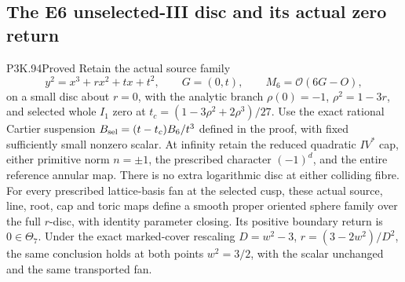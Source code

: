 \subsection{The E6 unselected-III disc and its actual zero return}
\begin{statement}{P3K.94}{Proved}
Retain the actual source family
\[
 y^2=x^3+r x^2+t x+t^2,\qquad G=(0,t),\qquad M_6=\mathcal O(6G-O),
\]
on a small disc about \(r=0\), with the analytic branch \(\rho(0)=-1\), \(\rho^2=1-3r\), and selected whole \(I_1\) zero at \(t_c=(1-3\rho^2+2\rho^3)/27\). Use the exact rational Cartier suspension \(B_{\rm sel}=(t-t_c)B_6/t^3\) defined in the proof, with fixed sufficiently small nonzero scalar. At infinity retain the reduced quadratic \(IV^*\) cap, either primitive norm \(n=\pm1\), the prescribed character \((-1)^d\), and the entire reference annular map. There is no extra logarithmic disc at either colliding fibre. For every prescribed lattice-basis fan at the selected cusp, these actual source, line, root, cap and toric maps define a smooth proper oriented sphere family over the full \(r\)-disc, with identity parameter closing. Its positive boundary return is \(0\in\Theta_7\). Under the exact marked-cover rescaling \(D=w^2-3\), \(r=(3-2w^2)/D^2\), the same conclusion holds at both points \(w^2=3/2\), with the scalar unchanged and the same transported fan.
\end{statement}

